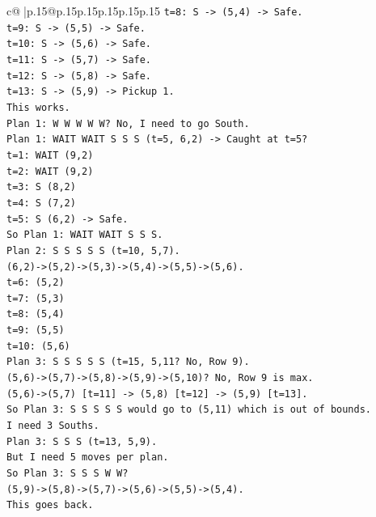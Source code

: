 \documentclass{article}
\begin{document}
{\begin{supertabular}{c@{$\;$}|p{.15\linewidth}@{}p{.15\linewidth}p{.15\linewidth}p{.15\linewidth}p{.15\linewidth}p{.15\linewidth}}
{{{\texttt{t=8: S {-}> (5,4) {-}> Safe.} \\
\texttt{t=9: S {-}> (5,5) {-}> Safe.} \\
\texttt{t=10: S {-}> (5,6) {-}> Safe.} \\
\texttt{t=11: S {-}> (5,7) {-}> Safe.} \\
\texttt{t=12: S {-}> (5,8) {-}> Safe.} \\
\texttt{t=13: S {-}> (5,9) {-}> Pickup 1.} \\
\texttt{This works.} \\
\texttt{Plan 1: W W W W W? No, I need to go South.} \\
\texttt{Plan 1: WAIT WAIT S S S (t=5, 6,2) {-}> Caught at t=5?} \\
\texttt{t=1: WAIT (9,2)} \\
\texttt{t=2: WAIT (9,2)} \\
\texttt{t=3: S (8,2)} \\
\texttt{t=4: S (7,2)} \\
\texttt{t=5: S (6,2) {-}> Safe.} \\
\texttt{So Plan 1: WAIT WAIT S S S.} \\
\texttt{Plan 2: S S S S S (t=10, 5,7).} \\
\texttt{(6,2){-}>(5,2){-}>(5,3){-}>(5,4){-}>(5,5){-}>(5,6).} \\
\texttt{t=6: (5,2)} \\
\texttt{t=7: (5,3)} \\
\texttt{t=8: (5,4)} \\
\texttt{t=9: (5,5)} \\
\texttt{t=10: (5,6)} \\
\texttt{Plan 3: S S S S S (t=15, 5,11? No, Row 9).} \\
\texttt{(5,6){-}>(5,7){-}>(5,8){-}>(5,9){-}>(5,10)? No, Row 9 is max.} \\
\texttt{(5,6){-}>(5,7) {[}t=11{]} {-}> (5,8) {[}t=12{]} {-}> (5,9) {[}t=13{]}.} \\
\texttt{So Plan 3: S S S S S would go to (5,11) which is out of bounds.} \\
\texttt{I need 3 Souths.} \\
\texttt{Plan 3: S S S (t=13, 5,9).} \\
\texttt{But I need 5 moves per plan.} \\
\texttt{So Plan 3: S S S W W?} \\
\texttt{(5,9){-}>(5,8){-}>(5,7){-}>(5,6){-}>(5,5){-}>(5,4).} \\
\texttt{This goes back.} \\
}}}
\end{supertabular}}
\end{document}

